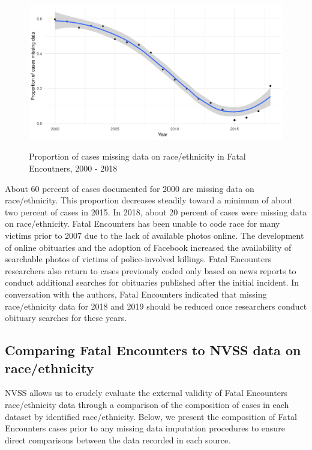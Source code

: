\documentclass{article}
\begin{document}
\begin{figure}
	\centering
	\includegraphics[width=\linewidth]{vis/prop_missing_race.pdf}
	\label{fig:missing_race_ts}
	\caption{Proportion of cases missing data on race/ethnicity in Fatal Encoutners, 2000 - 2018}
\end{figure}

About 60 percent of cases documented for 2000 are missing data on race/ethnicity. This proportion decreases steadily toward a minimum of about two percent of cases in 2015. In 2018, about 20 percent of cases were missing data on race/ethnicity. Fatal Encounters has been unable to code race for many victims prior to 2007 due to the lack of available photos online. The development of online obituaries and the adoption of Facebook increased the availability of searchable photos of victims of police-involved killings. Fatal Encounters researchers also return to cases previously coded only based on news reports to conduct additional searches for obituaries published after the initial incident. In conversation with the authors, Fatal Encounters indicated that missing race/ethnicity data for 2018 and 2019 should be reduced once researchers conduct obituary searches for these years.

\subsection{Comparing Fatal Encounters to NVSS data on race/ethnicity}

NVSS allows us to crudely evaluate the external validity of Fatal Encounters race/ethnicity data through a comparison of the composition of cases in each dataset by identified race/ethnicity. Below, we present the composition of Fatal Encounters cases prior to any missing data imputation procedures to ensure direct comparisons between the data recorded in each source.
\end{document}
